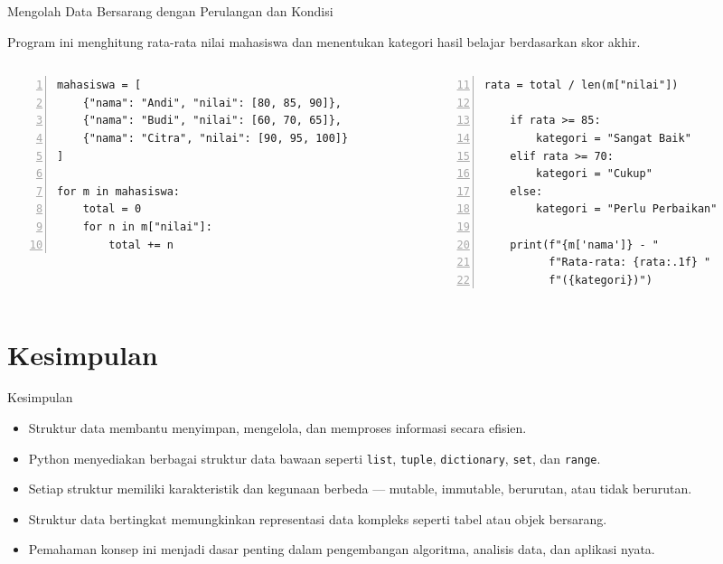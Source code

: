 \documentclass[aspectratio=169, table]{beamer}
\begin{document}
\begin{frame}[fragile]{Mengolah Data Bersarang dengan Perulangan dan Kondisi}
\vspace{20pt}

Program ini menghitung rata-rata nilai mahasiswa dan 
    menentukan kategori hasil belajar berdasarkan skor akhir.

\begin{columns}[T]
  \begin{column}{0.48\textwidth}
    \begin{lstlisting}[style=PythonStyle, numbers=left, firstnumber=1, basicstyle=\ttfamily\scriptsize]
mahasiswa = [
	{"nama": "Andi", "nilai": [80, 85, 90]},
	{"nama": "Budi", "nilai": [60, 70, 65]},
	{"nama": "Citra", "nilai": [90, 95, 100]}
]

for m in mahasiswa:
    total = 0
    for n in m["nilai"]:
        total += n
    \end{lstlisting}
  \end{column}

  \begin{column}{0.48\textwidth}
    \begin{lstlisting}[style=PythonStyle, numbers=left, firstnumber=11, basicstyle=\ttfamily\scriptsize]
    rata = total / len(m["nilai"])
    
    if rata >= 85:
        kategori = "Sangat Baik"
    elif rata >= 70:
        kategori = "Cukup"
    else:
        kategori = "Perlu Perbaikan"
    
    print(f"{m['nama']} - "
          f"Rata-rata: {rata:.1f} "
          f"({kategori})")
    \end{lstlisting}
  \end{column}
\end{columns}

\end{frame}

\section{Kesimpulan}

\begin{frame}{Kesimpulan}
\vspace{20pt}

\begin{itemize}
  \item Struktur data membantu menyimpan, mengelola, dan memproses informasi secara efisien. 
  \item Python menyediakan berbagai struktur data bawaan seperti \texttt{list}, \texttt{tuple}, \texttt{dictionary}, \texttt{set}, dan \texttt{range}.
  \item Setiap struktur memiliki karakteristik dan kegunaan berbeda — mutable, immutable, berurutan, atau tidak berurutan.
  \item Struktur data bertingkat memungkinkan representasi data kompleks seperti tabel atau objek bersarang.
  \item Pemahaman konsep ini menjadi dasar penting dalam pengembangan algoritma, analisis data, dan aplikasi nyata.
\end{itemize}

\end{frame}
\end{document}
